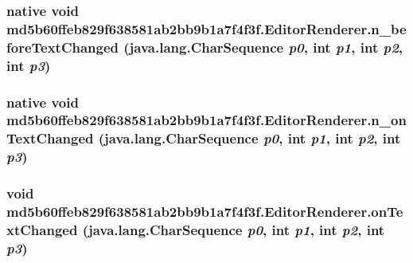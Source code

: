\hypertarget{classmd5b60ffeb829f638581ab2bb9b1a7f4f3f_1_1_editor_renderer_8db46b5036f8f8cc07e8ee41c77b8142}{
\subsubsection[{n\_\-beforeTextChanged}]{\setlength{\rightskip}{0pt plus 5cm}native void md5b60ffeb829f638581ab2bb9b1a7f4f3f.EditorRenderer.n\_\-beforeTextChanged (java.lang.CharSequence {\em p0}, \/  int {\em p1}, \/  int {\em p2}, \/  int {\em p3})}}
\label{classmd5b60ffeb829f638581ab2bb9b1a7f4f3f_1_1_editor_renderer_8db46b5036f8f8cc07e8ee41c77b8142}


\hypertarget{classmd5b60ffeb829f638581ab2bb9b1a7f4f3f_1_1_editor_renderer_e07894d667938cbc7d7e06102fcf9f59}{
\subsubsection[{n\_\-onTextChanged}]{\setlength{\rightskip}{0pt plus 5cm}native void md5b60ffeb829f638581ab2bb9b1a7f4f3f.EditorRenderer.n\_\-onTextChanged (java.lang.CharSequence {\em p0}, \/  int {\em p1}, \/  int {\em p2}, \/  int {\em p3})}}
\label{classmd5b60ffeb829f638581ab2bb9b1a7f4f3f_1_1_editor_renderer_e07894d667938cbc7d7e06102fcf9f59}


\hypertarget{classmd5b60ffeb829f638581ab2bb9b1a7f4f3f_1_1_editor_renderer_5c47c614038fade51dab2c5f57a02d43}{
\subsubsection[{onTextChanged}]{\setlength{\rightskip}{0pt plus 5cm}void md5b60ffeb829f638581ab2bb9b1a7f4f3f.EditorRenderer.onTextChanged (java.lang.CharSequence {\em p0}, \/  int {\em p1}, \/  int {\em p2}, \/  int {\em p3})}}
\label{classmd5b60ffeb829f638581ab2bb9b1a7f4f3f_1_1_editor_renderer_5c47c614038fade51dab2c5f57a02d43}




